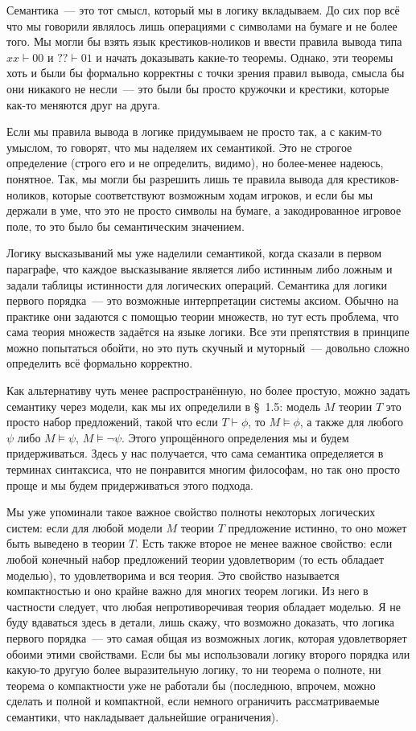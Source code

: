 Семантика~--- это тот смысл, который мы в логику вкладываем. До сих пор всё что мы говорили являлось лишь операциями с символами на бумаге и не более того. Мы могли бы взять язык крестиков-ноликов и ввести правила вывода типа $xx\vdash00$ и $??\vdash01$ и начать доказывать какие-то теоремы. Однако, эти теоремы хоть и были бы формально корректны с точки зрения правил вывода, смысла бы они никакого не несли~--- это были бы просто кружочки и крестики, которые как-то меняются друг на друга. 

Если мы правила вывода в логике придумываем не просто так, а с каким-то умыслом, то говорят, что мы наделяем их семантикой. Это не строгое определение (строго его и не определить, видимо), но более-менее надеюсь, понятное. Так, мы могли бы разрешить лишь те правила вывода для крестиков-ноликов, которые соответствуют возможным ходам игроков, и если бы мы держали в уме, что это не просто символы на бумаге, а закодированное игровое поле, то это было бы семантическим значением.

Логику высказываний мы уже наделили семантикой, когда сказали в первом параграфе, что каждое высказывание является либо истинным либо ложным и задали таблицы истинности для логических операций. Семантика для логики первого порядка~--- это возможные интерпретации системы аксиом. Обычно на практике они задаются с помощью теории множеств, но тут есть проблема, что сама теория множеств задаётся на языке логики. Все эти препятствия в принципе можно попытаться обойти, но это путь скучный и муторный~--- довольно сложно определить всё формально корректно.

Как альтернативу чуть менее распространённую, но более простую, можно задать семантику через модели, как мы их определили в \S~1.5: модель $M$ теории $T$ это просто набор предложений, такой что если $T\vdash\phi$, то $M\models \phi$, а также для любого $\psi$ либо $M\models \psi$, $M\models \neg\psi$. Этого упрощённого определения мы и будем придерживаться. Здесь у нас получается, что сама семантика определяется в терминах синтаксиса, что не понравится многим философам, но так оно просто проще и мы будем придерживаться этого подхода.

Мы уже упоминали такое важное свойство полноты некоторых логических систем: если для любой модели $M$ теории $T$ предложение истинно, то оно может быть выведено в теории $T$. Есть также второе не менее важное свойство: если любой конечный набор предложений теории удовлетворим (то есть обладает моделью), то удовлетворима и вся теория. Это свойство называется компактностью и оно крайне важно для многих теорем логики. Из него в частности следует, что любая непротиворечивая теория обладает моделью. Я не буду вдаваться здесь в детали, лишь скажу, что возможно доказать, что логика первого порядка~--- это самая общая из возможных логик, которая удовлетворяет обоими этими свойствами. Если бы мы использовали логику второго порядка или какую-то другую более выразительную логику, то ни теорема о полноте, ни теорема о компактности уже не работали бы (последнюю, впрочем, можно сделать и полной и компактной, если немного ограничить рассматриваемые семантики, что накладывает дальнейшие ограничения).

